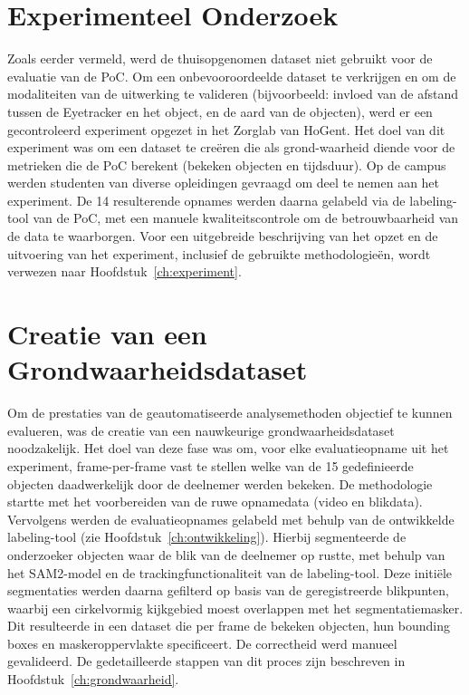 
\section{Experimenteel Onderzoek}

Zoals eerder vermeld, werd de thuisopgenomen dataset niet gebruikt voor de evaluatie van de PoC. 
Om een onbevooroordeelde dataset te verkrijgen en om de modaliteiten van de uitwerking te valideren (bijvoorbeeld: invloed van de afstand tussen de Eyetracker en het object, en de aard van de objecten), werd er een gecontroleerd experiment opgezet in het Zorglab van HoGent.
Het doel van dit experiment was om een dataset te creëren die als grond-waarheid diende voor de metrieken die de PoC berekent (bekeken objecten en tijdsduur).
Op de campus werden studenten van diverse opleidingen gevraagd om deel te nemen aan het experiment.
De 14 resulterende opnames werden daarna gelabeld via de labeling-tool van de PoC, met een manuele kwaliteitscontrole om de betrouwbaarheid van de data te waarborgen.
Voor een uitgebreide beschrijving van het opzet en de uitvoering van het experiment, inclusief de gebruikte methodologieën, wordt verwezen naar Hoofdstuk~\ref{ch:experiment}.

\section{Creatie van een Grondwaarheidsdataset}

Om de prestaties van de geautomatiseerde analysemethoden objectief te kunnen evalueren, was de creatie van een nauwkeurige 
grondwaarheidsdataset noodzakelijk. Het doel van deze fase was om, voor elke evaluatieopname uit het experiment, 
frame-per-frame vast te stellen welke van de 15 gedefinieerde objecten daadwerkelijk door de deelnemer werden bekeken. 
De methodologie startte met het voorbereiden van de ruwe opnamedata (video en blikdata). 
Vervolgens werden de evaluatieopnames gelabeld met behulp van de ontwikkelde labeling-tool (zie Hoofdstuk~\ref{ch:ontwikkeling}).
Hierbij segmenteerde de onderzoeker objecten waar de blik van de deelnemer op rustte, met behulp van het SAM2-model en de trackingfunctionaliteit van de labeling-tool.
Deze initiële segmentaties werden daarna gefilterd op basis van de geregistreerde blikpunten, waarbij een cirkelvormig kijkgebied moest overlappen met het segmentatiemasker. 
Dit resulteerde in een dataset die per frame de bekeken objecten, hun bounding boxes en maskeroppervlakte specificeert. 
De correctheid werd manueel gevalideerd. De gedetailleerde stappen van dit proces zijn beschreven in Hoofdstuk~\ref{ch:grondwaarheid}.


